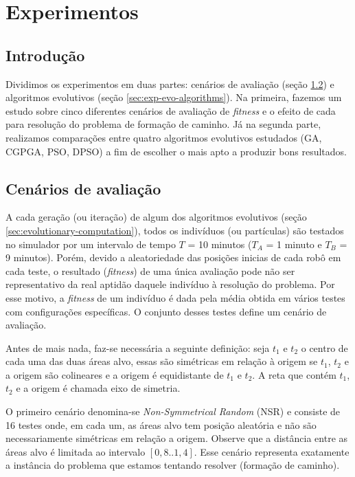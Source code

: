 \chapter{Experimentos}
\label{cha:experiments}

\section{Introdução}

Dividimos os experimentos em duas partes: cenários de avaliação (seção \ref{sec:evaluation-scenarios}) e algoritmos evolutivos (seção \ref{sec:exp-evo-algorithms}). Na primeira, fazemos um estudo sobre cinco diferentes cenários de avaliação de \textit{fitness} e o efeito de cada para resolução do problema de formação de caminho. Já na segunda parte, realizamos comparações entre quatro algoritmos evolutivos estudados (GA, CGPGA, PSO, DPSO) a fim de escolher o mais apto a produzir bons resultados.

\section{Cenários de avaliação}
\label{sec:evaluation-scenarios}

A cada geração (ou iteração) de algum dos algoritmos evolutivos (seção \ref{sec:evolutionary-computation}), todos os indivíduos (ou partículas) são testados no simulador por um intervalo de tempo $T$ = 10 minutos ($T_{A}$ = 1 minuto e $T_{B}$ = 9 minutos). Porém, devido a aleatoriedade das posições inicias de cada robô em cada teste, o resultado (\textit{fitness}) de uma única avaliação pode não ser representativo da real aptidão daquele indivíduo à resolução do problema. Por esse motivo, a \textit{fitness} de um indivíduo é dada pela média obtida em vários testes com configurações específicas. O conjunto desses testes define um cenário de avaliação.

Antes de mais nada, faz-se necessária a seguinte definição: seja $t_{1}$ e $t_{2}$ o centro de cada uma das duas áreas alvo, essas são simétricas em relação à origem se $t_{1}$, $t_{2}$ e a origem são colineares e a origem é equidistante de $t_{1}$ e $t_{2}$. A reta que contém $t_{1}$, $t_{2}$ e a origem é chamada eixo de simetria.

O primeiro cenário denomina-se \textit{Non-Symmetrical Random} (NSR) e consiste de 16 testes onde, em cada um, as áreas alvo tem posição aleatória e não são necessariamente simétricas em relação a origem. Observe que a distância entre as áreas alvo é limitada ao intervalo $[0,8..1,4]$. Esse cenário representa exatamente a instância do problema que estamos tentando resolver (formação de caminho).

